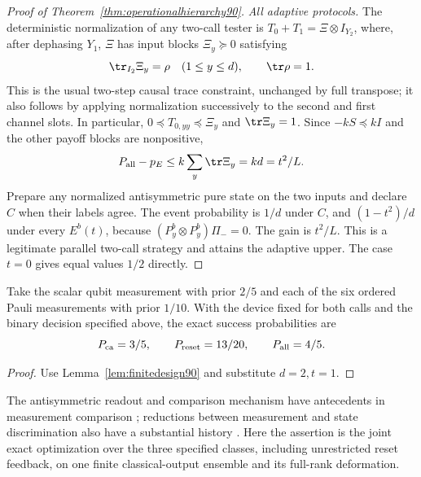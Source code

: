 \begin{proof}[Proof of Theorem~\ref{thm:operationalhierarchy90}]
\emph{All adaptive protocols.}
The deterministic normalization of any two-call tester is
$T_0+T_1=\Xi\otimes I_{Y_2}$, where, after dephasing $Y_1$,
$\Xi$ has input blocks $\Xi_y\succeq0$ satisfying
\[
 \tr_{I_2}\Xi_y=\rho\quad(1\le y\le d),\qquad \tr\rho=1.
\]
This is the usual two-step causal trace constraint, unchanged by full
transpose; it also follows by applying normalization successively to
the second and first channel slots.  In particular,
$0\preceq T_{0,yy}\preceq\Xi_y$ and $\tr\Xi_y=1$.
Since $-kS\preceq kI$ and the other payoff blocks are nonpositive,
\[
 P_{\rm all}-p_E\le k\sum_y\tr\Xi_y=kd=t^2/L.
\]
Prepare any normalized antisymmetric pure state on the two inputs and
declare $C$ when their labels agree.  The event probability is $1/d$
under $C$, and $(1-t^2)/d$ under every $E^b(t)$, because
$(P_y^b\otimes P_y^b)\Pi_-=0$.  The gain is $t^2/L$.
This is a legitimate parallel two-call strategy and attains the
adaptive upper.  The case $t=0$ gives equal values $1/2$ directly.
\end{proof}

\begin{corollary}\label{cor:qubitgame90}
Take the scalar qubit measurement with prior $2/5$ and each of the six
ordered Pauli measurements with prior $1/10$.  With the device fixed
for both calls and the binary decision specified above, the exact
success probabilities are
\[
 P_{\rm ca}=3/5,\qquad P_{\rm reset}=13/20,\qquad P_{\rm all}=4/5.
\]
\end{corollary}
\begin{proof}
Use Lemma~\ref{lem:finitedesign90} and substitute $d=2,t=1$.
\end{proof}
The antisymmetric readout and comparison mechanism have antecedents in
measurement comparison \cite{ZHS90}; reductions between measurement and
state discrimination also have a substantial history \cite{SZ74}.
Here the assertion is the joint exact optimization over the three
specified classes, including unrestricted reset feedback, on one finite
classical-output ensemble and its full-rank deformation.

